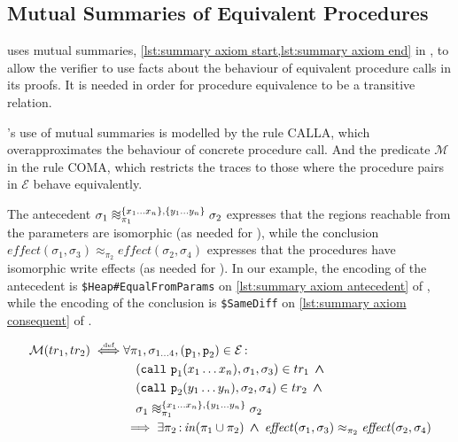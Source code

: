\documentclass[runningheads,a4paper]{llncs}
\DeclareMathOperator{\band}{\bm{\;\land\;}}
\DeclareMathOperator{\suchthat}{:}
\newcommand*{\qvars}[2]{#1_{#2}}
\newcommand*{\defiff}{\stackrel{\text{\tiny def}}{\iff}}
\newcommand{\tr}{tr}
\newcommand*\iso{\approx}
\newcommand*{\equivmap}{\mathcal{E}}
\newcommand*{\callRuleAbstract}{\textnormal{CALLA}}
\newcommand*{\composeRuleAbstract}{\textnormal{COMA}}
\newcommand{\diff}{\mathit{effect}}
\newcommand*{\call}{\mathtt{call}}
\newcommand*{\fun}{\texttt{p}}
\newcommand*{\bijection}[1]{\mathit{in}{\left(#1\right)}}
\newcommand*{\wiso}{%
  \mathrel{\vcenter{\offinterlineskip
  \hbox{$\sim$}\vskip-.35ex\hbox{$\sim$}\vskip-.35ex\hbox{$\sim$}}}}
\newcommand*{\mutR}{\mathcal{M}}
\newcommand*{\store}{\sigma}
\begin{document}
\subsection{Mutual Summaries of Equivalent Procedures}\label{sec:mutual}

\tool{} uses mutual summaries, \cref{lst:summary axiom start,lst:summary axiom end} in , to allow the verifier to use facts about the behaviour of equivalent procedure calls in its proofs. It is needed in order for procedure equivalence to be a transitive relation.

\tool{}'s use of mutual summaries is modelled by the rule \callRuleAbstract{}, which overapproximates the behaviour of concrete procedure call. And the predicate $\mutR$ in the rule \composeRuleAbstract{}, which restricts the traces to those where the procedure pairs in $\equivmap$ behave equivalently.

The antecedent $\store_1 \wiso_{\pi_1}^{\{x_1 \ldots x_n\},\{y_1 \ldots y_n\}} \store_2$ expresses that the regions reachable from the parameters are isomorphic (as needed for \ctwo{}), while the conclusion $\diff(\store_1,\store_3) \iso_{\pi_2} \diff(\store_2,\store_4)$ expresses that the procedures have isomorphic write effects (as needed for \cthree{}). In our example, the encoding of the antecedent is \texttt{\$Heap\#EqualFromParams} on \cref{lst:summary axiom antecedent} of , while the encoding of the conclusion is \texttt{\$SameDiff} on \cref{lst:summary axiom consequent} of .

\begin{definition}\label{def:mutual summary}\setlength{\parindent}{0cm}
\[\begin{aligned}
\mutR(\tr_1,\tr_2) \defiff
&\forall \pi_1,\qvars{\store}{1 \ldots 4},(\fun_1,\fun_2) \in \equivmap \suchthat \\
&\quad		(\call~\fun_1(x_1 \ldots x_n),\store_1,\store_3) \in \tr_1 \band \\
&\quad		(\call~\fun_2(y_1 \ldots y_n),\store_2,\store_4) \in \tr_2 \band \\
&\quad		\store_1 \wiso_{\pi_1}^{\{x_1 \ldots x_n\},\{y_1 \ldots y_n\}} \store_2 \\
&	\implies
 	\exists \pi_2 \suchthat \bijection{\pi_1 \cup \pi_2} \band \diff(\store_1,\store_3) \iso_{\pi_2} \diff(\store_2,\store_4)
\end{aligned}\]
\end{definition}
\end{document}

